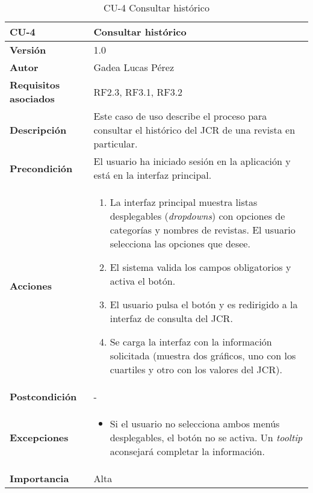 \begin{itemize}
\begin{table}[p]
\centering
\begin{tabularx}{\linewidth}{ p{} p{} }
\toprule
\textbf{CU-4} & \textbf{Consultar histórico}\\
\toprule
\textbf{Versión} & 1.0 \\
\textbf{Autor} & Gadea Lucas Pérez \\
\textbf{Requisitos asociados} & RF2.3, RF3.1, RF3.2 \\
\textbf{Descripción} & Este caso de uso describe el proceso para consultar el histórico del JCR de una revista en particular.\\
\textbf{Precondición} & El usuario ha iniciado sesión en la aplicación y está en la interfaz principal. \\
\textbf{Acciones} &
\begin{enumerate}
\def\labelenumi{\arabic{enumi}.}
\tightlist
\item La interfaz principal muestra listas desplegables (\textit{dropdowns}) con opciones de categorías y nombres de revistas. El usuario selecciona las opciones que desee.
\item El sistema valida los campos obligatorios y activa el botón. 
\item El usuario pulsa el botón y es redirigido a la interfaz de consulta del JCR.
\item Se carga la interfaz con la información solicitada (muestra dos gráficos, uno con los cuartiles y otro con los valores del JCR).
\end{enumerate}\\
\textbf{Postcondición} & - \\
\textbf{Excepciones} &
\begin{itemize}
    \item Si el usuario no selecciona ambos menús desplegables, el botón no se activa. Un \textit{tooltip} aconsejará completar la información.
\end{itemize} \\
\textbf{Importancia} & Alta\\
\bottomrule
\end{tabularx}
\caption{CU-4 Consultar histórico}
\label{tab:cu4}
\end{table}



\end{itemize}
